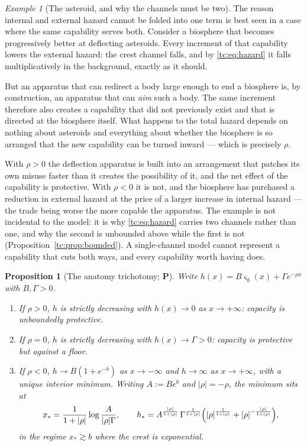 \documentclass[11pt]{article}
\numberwithin{equation}{section}
\theoremstyle{plain}
\newtheorem{proposition}[theorem]{Proposition}
\theoremstyle{definition}
\theoremstyle{remark}
\newtheorem{example}[theorem]{Example}
\begin{document}
\begin{example}[The asteroid, and why the channels must be two]
\label{gr1:ex:asteroid}
The reason internal and external hazard cannot be folded into one term
is best seen in a case where the same capability serves both. Consider a
biosphere that becomes progressively better at deflecting asteroids.
Every increment of that capability lowers the external hazard: the
crest channel falls, and by \eqref{tc:eq:hazard} it falls
multiplicatively in the background, exactly as it should.

But an apparatus that can redirect a body large enough to end a
biosphere is, by construction, an apparatus that can \emph{aim} such a
body. The same increment therefore also creates a capability that did
not previously exist and that is directed at the biosphere itself. What
happens to the total hazard depends on nothing about asteroids and
everything about whether the biosphere is so arranged that the new
capability can be turned inward --- which is precisely $\rho$.

With $\rho>0$ the deflection apparatus is built into an arrangement that
patches its own misuse faster than it creates the possibility of it, and
the net effect of the capability is protective. With $\rho<0$ it is not,
and the biosphere has purchased a reduction in external hazard at the
price of a larger increase in internal hazard --- the trade being worse
the more capable the apparatus. The example is not incidental to the
model: it is why \eqref{tc:eq:hazard} carries two channels rather than
one, and why the second is unbounded above while the first is not
(Proposition~\ref{tc:prop:bounded}). A single-channel model cannot
represent a capability that cuts both ways, and every capability worth
having does.
\end{example}

\begin{proposition}[The anatomy trichotomy; \textbf{P}]
\label{gr1:prop:trichotomy}
Write $h(x)=B\varsigma_b(x)+\Gamma e^{-\rho x}$ with $B,\Gamma>0$.
\begin{enumerate}[label=\emph{(\roman*)},itemsep=1pt]
\item If $\rho>0$, $h$ is strictly decreasing with $h(x)\to0$ as
$x\to+\infty$: capacity is unboundedly protective.
\item If $\rho=0$, $h$ is strictly decreasing with
$h(x)\to\Gamma>0$: capacity is protective but against a floor.
\item If $\rho<0$, $h\to B(1+e^{-b})$ as $x\to-\infty$ and
$h\to\infty$ as $x\to+\infty$, with a unique interior minimum. Writing
$A:=Be^{b}$ and $|\rho|=-\rho$, the minimum sits at
\begin{equation}\label{gr1:eq:xstar}
x_\ast=\frac{1}{1+|\rho|}\log\frac{A}{|\rho|\Gamma},
\qquad
h_\ast=A^{\frac{|\rho|}{1+|\rho|}}\,\Gamma^{\frac{1}{1+|\rho|}}
\Bigl(|\rho|^{\frac{1}{1+|\rho|}}+|\rho|^{-\frac{|\rho|}{1+|\rho|}}\Bigr),
\end{equation}
in the regime $x_\ast\gtrsim b$ where the crest is exponential.
\end{enumerate}
\end{proposition}
\end{document}
